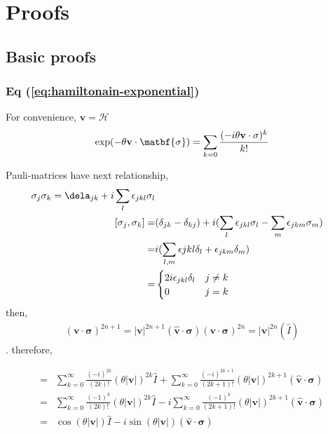 \chapter{Proofs}

\section{Basic proofs}

\subsection{Eq (\ref{eq:hamiltonain-exponential})}
\label{appendix-proof-1}

For convenience, $\mathbf{v} = \mathcal{H}$
\begin{equation}
    \exp(- \theta \mathbf{v} \cdot \matbf{\sigma}) = \sum_{k=0} \frac{(-i\theta \mathbf{v} \cdot \mathbf{\sigma})^k}{k!} \\
\end{equation}

Pauli-matrices have next relationship,
\begin{align}
    \sigma_j \sigma_k = \dela_{jk}  + i\sum_{l} \epsilon_{jkl}\sigma_l \\
    [\sigma_j, \sigma_k] =& (\delta_{jk} - \delta_{kj}) + i (\sum_{l} \epsilon_{jkl}\sigma_l - \sum_{m} \epsilon_{jkm}\sigma_m)\\
     =& i (\sum_{l, m} \epsilon{jkl} \delta_l + \epsilon_{jkm} \delta_m)\\
     = & \begin{cases}
        2 i \epsilon_{jkl}\delta_l & j \neq k \\
        0 & j=k
     \end{cases}
\end{align}
then,
\begin{align}
    (\mathbf{v} \cdot \mathbf{\sigma})^{2n +1} = |\mathbf{v}|^{2n+1} (\hat{\mathbf{v}} \cdot \mathbf{\sigma})
    (\mathbf{v} \cdot \mathbf{\sigma})^{2n} = |\mathbf{v}|^{2n} (\hat{I})
\end{align}.
therefore,

\begin{align}
    =& \sum_{k=0}^\infty \frac{(-i)^{2k}}{(2k)!} (\theta |\mathbf{v}|)^{2k} \hat{I} + \sum_{k=0}^\infty \frac{(-i)^{2k+1}}{(2k+1)!} (\theta |\mathbf{v}|)^{2k+1} (\hat{\mathbf{v}} \cdot \mathbf{\sigma})\\
    =& \sum_{k=0}^\infty \frac{(-1)^{k}}{(2k)!} (\theta |\mathbf{v}|)^{2k} \hat{I} -i \sum_{k=0}^\infty \frac{(-1)^{k}}{(2k+1)!} (\theta |\mathbf{v}|)^{2k+1} (\hat{\mathbf{v}} \cdot \mathbf{\sigma}) \\
    = & \cos(\theta |\mathbf{v}|) \hat{I} - i \sin(\theta |\mathbf{v}|) (\hat{\mathbf{v}} \cdot \mathbf{\sigma})
\end{align}